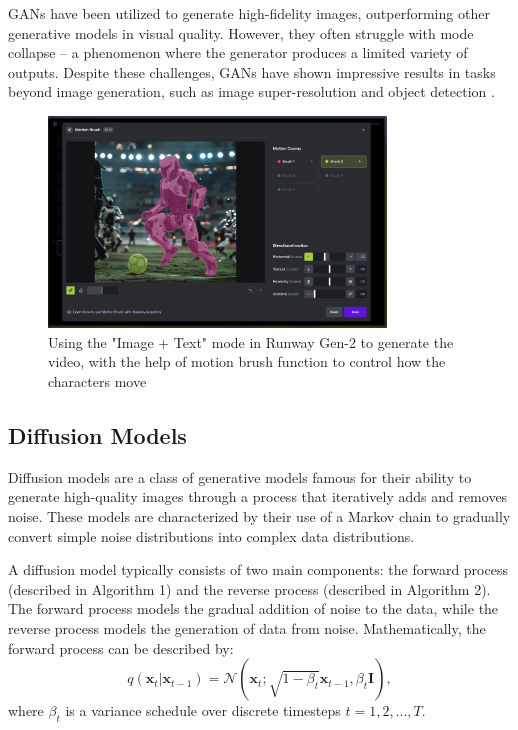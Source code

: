 \documentclass[11pt,a4paper,oneside]{report}
\begin{document}
GANs have been utilized to generate high-fidelity images, outperforming other generative models in visual quality. However, they often struggle with mode collapse -- a phenomenon where the generator produces a limited variety of outputs. Despite these challenges, GANs have shown impressive results in tasks beyond image generation, such as image super-resolution \cite{denton2015deep}and object detection \cite{goodfellow2014generative}.

\begin{figure}[htbp]
  \centering
  \includegraphics[width=0.8\textwidth]{Runway.png}
  \caption{Using the "Image + Text" mode in Runway Gen-2 to generate the video, with the help of motion brush function to control how the characters move}
\end{figure}

\subsection{Diffusion Models}

Diffusion models \cite{sohl2015deep, ho2020denoising} are a class of generative models famous for their ability to generate high-quality images through a process that iteratively adds and removes noise. These models are characterized by their use of a Markov chain to gradually convert simple noise distributions into complex data distributions.

A diffusion model typically consists of two main components: the forward process (described in Algorithm 1) and the reverse process (described in Algorithm 2). The forward process models the gradual addition of noise to the data, while the reverse process models the generation of data from noise. Mathematically, the forward process can be described by:
\begin{equation}
q(\mathbf{x}_t | \mathbf{x}_{t-1}) = \mathcal{N}(\mathbf{x}_t; \sqrt{1-\beta_t} \mathbf{x}_{t-1}, \beta_t \mathbf{I}),
\end{equation}
where $\beta_t$ is a variance schedule over discrete timesteps $t = 1, 2, ..., T$. 
\end{document}
